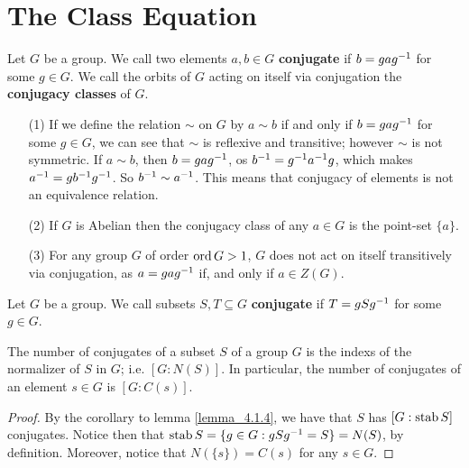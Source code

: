 \section{The Class Equation}
\label{section_4.3}

\begin{definition}
  Let $G$ be a group. We call two elements  $a,b \in G$ \textbf{conjugate} if
  $b=gag^{-1}$ for some $g \in G$. We call the orbits of $G$ acting on itself
  via conjugation the \textbf{conjugacy classes} of $G$.
\end{definition}

\begin{example}\label{example_4.7}
  \begin{enumerate}
    \item[(1)] If we define the relation $\sim$ on $G$ by $a \sim b$ if and
      only if  $b=gag^{-1}$ for some $g \in G$, we can see that  $\sim$
      is reflexive and transitive; however  $\sim$ is not symmetric. If $a
      \sim b$, then  $b=gag^{-1}$, os $b^{-1}=g^{-1}a^{-1}g$, which
      makes $a^{-1}=gb^{-1}g^{-1}$. So $b^{-1} \sim a^{-1}$. This
      means that conjugacy of elements is not an equivalence relation.

    \item[(2)] If $G$ is Abelian then the conjugacy class of any $a \in G$
      is the point-set $\{a\}$.

    \item[(3)] For any group $G$ of order  $\operatorname{ord}{G}>1$, $G$ does not act on
      itself transitively via conjugation, as  $a=gag^{-1}$ if, and only
      if $a \in Z(G)$.
  \end{enumerate}
\end{example}

\begin{definition}
  Let $G$ be a group. We call subsets  $S,T \subseteq G$  \textbf{conjugate}
  if $T=gSg^{-1}$ for some $g \in G$.
\end{definition}

\begin{lemma}\label{lemma_4.3.1}
  The number of conjugates of a subset $S$ of a group  $G$ is the indexs of
  the normalizer of $S$ in $G$; i.e.  $[G:N(S)]$. In particular, the number of
  conjugates of an element $s \in G$ is  $[G:C(s)]$.
\end{lemma}
\begin{proof}
  By the corollary to lemma \ref{lemma_4.1.4}, we have that $S$ has  $[G:\operatorname{stab}{S}]$
  conjugates. Notice then that $\operatorname{stab}{S}=\{g \in G : gSg^{-1}=S\}=N(S)$, by
  definition. Moreover, notice that $N(\{s\})=C(s)$ for any $s \in G$.
\end{proof}

